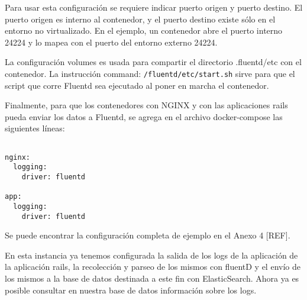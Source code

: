 Para usar esta configuración se requiere indicar puerto origen y puerto
destino. El puerto origen es interno al contenedor, y el puerto destino existe
sólo en el entorno no virtualizado. En el ejemplo, un contenedor abre el puerto
interno 24224 y lo mapea con el puerto del entorno externo 24224.

La configuración volumes es usada para compartir el directorio .fluentd/etc con
el contenedor. La instrucción command: \texttt{/fluentd/etc/start.sh} sirve para que el
script que corre Fluentd sea ejecutado al poner en marcha el contenedor.

Finalmente, para que los contenedores con NGINX y con las aplicaciones rails
pueda enviar los datos a Fluentd, se agrega en el archivo docker-compose las
siguientes líneas:

\begin{lstlisting}

nginx:
  logging:
    driver: fluentd

app:
  logging:
    driver: fluentd

\end{lstlisting}

Se puede encontrar la configuración completa de ejemplo en el Anexo 4 [REF].

En esta instancia ya tenemos configurada la salida de los logs de la aplicación
de la aplicación rails, la recolección y parseo de los mismos con fluentD y el
envío de los mismos a la base de datos destinada a este fin con ElasticSearch.
Ahora ya es posible consultar en nuestra base de datos información sobre los
logs.

